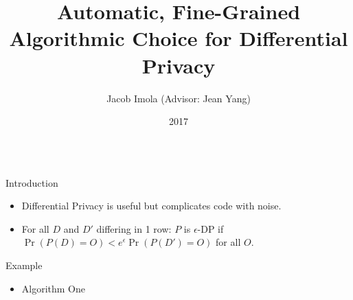 \documentclass[final]{beamer}
\title{Automatic, Fine-Grained Algorithmic Choice for Differential Privacy}
\author{Jacob Imola (Advisor: Jean Yang)}
\institute{Carnegie Mellon University}
\date{2017}
\newlength{\sepwid}
\newlength{\onecolwid}
\begin{document}
\setlength{\belowcaptionskip}{2ex}
\setlength\belowdisplayshortskip{2ex}
\begin{frame}[t,fragile]
\begin{columns}
\begin{column}{\onecolwid}
\begin{block}{Introduction}
\begin{itemize}
\item Differential Privacy is useful but complicates code with noise.
\item For all $D$ and $D'$ differing in 1 row: $P$ is $\epsilon$-DP if $\Pr(P(D) = O) < e^\epsilon \Pr(P(D') = O)$ for all $O$.
\end{itemize}
\end{block}
\begin{block}{Example}
\begin{itemize}
\item Algorithm One
\end{itemize}
\begin{center}
\end{center}
\end{block}
\end{column}
\end{columns}
\end{frame}
\end{document}
